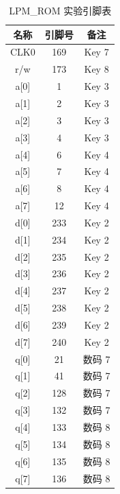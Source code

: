 \begin{enumerate}
    \begin{table}[H]
        \centering
        \begin{tabular}{|c|c|c|}
            \hline
            名称 & 引脚号 & 备注 \\
            \hline
            CLK0 & 169 & Key 7 \\
            \hline
            r/w & 173 & Key 8 \\
            \hline
            a[0] & 1 & Key 3 \\
            \hline
            a[1] & 2 & Key 3 \\
            \hline
            a[2] & 3 & Key 3 \\
            \hline
            a[3] & 4 & Key 3 \\
            \hline
            a[4] & 6 & Key 4 \\
            \hline
            a[5] & 7 & Key 4 \\
            \hline
            a[6] & 8 & Key 4 \\
            \hline
            a[7] & 12 & Key 4 \\
            \hline
            d[0] & 233 & Key 2 \\
            \hline
            d[1] & 234 & Key 2 \\
            \hline
            d[2] & 235 & Key 2 \\
            \hline
            d[3] & 236 & Key 2 \\
            \hline
            d[4] & 237 & Key 2 \\
            \hline
            d[5] & 238 & Key 2 \\
            \hline
            d[6] & 239 & Key 2 \\
            \hline
            d[7] & 240 & Key 2 \\
            \hline
            q[0] & 21 & 数码 7 \\
            \hline
            q[1] & 41 & 数码 7 \\
            \hline
            q[2] & 128 & 数码 7 \\
            \hline
            q[3] & 132 & 数码 7 \\
            \hline
            q[4] & 133 & 数码 8 \\
            \hline
            q[5] & 134 & 数码 8 \\
            \hline
            q[6] & 135 & 数码 8 \\
            \hline
            q[7] & 136 & 数码 8 \\
            \hline
        \end{tabular}
        \caption{LPM\_ROM 实验引脚表}
        \label{tab:pin2_2}
    \end{table}
    

\end{enumerate}
